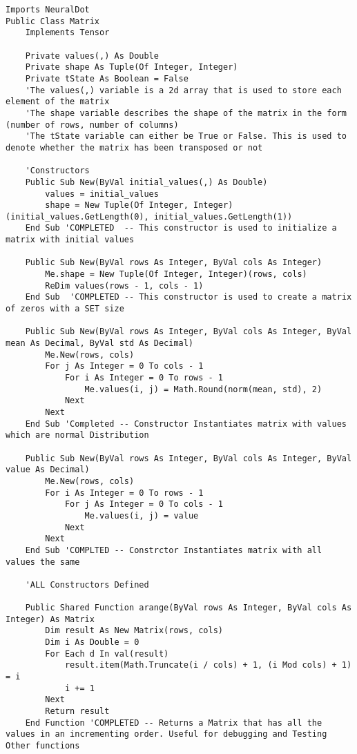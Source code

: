 \begin{verbatim}
Imports NeuralDot
Public Class Matrix
    Implements Tensor

    Private values(,) As Double
    Private shape As Tuple(Of Integer, Integer)
    Private tState As Boolean = False
    'The values(,) variable is a 2d array that is used to store each element of the matrix
    'The shape variable describes the shape of the matrix in the form (number of rows, number of columns)
    'The tState variable can either be True or False. This is used to denote whether the matrix has been transposed or not

    'Constructors
    Public Sub New(ByVal initial_values(,) As Double)
        values = initial_values
        shape = New Tuple(Of Integer, Integer)(initial_values.GetLength(0), initial_values.GetLength(1))
    End Sub 'COMPLETED  -- This constructor is used to initialize a matrix with initial values

    Public Sub New(ByVal rows As Integer, ByVal cols As Integer)
        Me.shape = New Tuple(Of Integer, Integer)(rows, cols)
        ReDim values(rows - 1, cols - 1)
    End Sub  'COMPLETED -- This constructor is used to create a matrix of zeros with a SET size

    Public Sub New(ByVal rows As Integer, ByVal cols As Integer, ByVal mean As Decimal, ByVal std As Decimal)
        Me.New(rows, cols)
        For j As Integer = 0 To cols - 1
            For i As Integer = 0 To rows - 1
                Me.values(i, j) = Math.Round(norm(mean, std), 2)
            Next
        Next
    End Sub 'Completed -- Constructor Instantiates matrix with values which are normal Distribution

    Public Sub New(ByVal rows As Integer, ByVal cols As Integer, ByVal value As Decimal)
        Me.New(rows, cols)
        For i As Integer = 0 To rows - 1
            For j As Integer = 0 To cols - 1
                Me.values(i, j) = value
            Next
        Next
    End Sub 'COMPLTED -- Constrctor Instantiates matrix with all values the same

    'ALL Constructors Defined

    Public Shared Function arange(ByVal rows As Integer, ByVal cols As Integer) As Matrix
        Dim result As New Matrix(rows, cols)
        Dim i As Double = 0
        For Each d In val(result)
            result.item(Math.Truncate(i / cols) + 1, (i Mod cols) + 1) = i
            i += 1
        Next
        Return result
    End Function 'COMPLETED -- Returns a Matrix that has all the values in an incrementing order. Useful for debugging and Testing Other functions


\end{verbatim}
